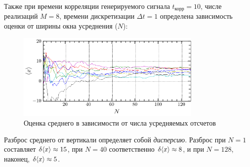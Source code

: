 \documentclass[a4paper,14pt]{extarticle}
\begin{document}
Также при времени корреляции генерируемого сигнала $t_\text{корр}=10$, числе реализаций $M=8$, времени дискретизации $\Delta t=1$ определена зависимость оценки от ширины окна усреднения ($N$):
\begin{figure}[H]
    \centering
    \includegraphics[width=0.8\textwidth]{fig/mean_from_N}
    \caption{Оценка среднего в зависимости от числа усредняемых отсчетов}
    \label{fig:mean_from_n}
\end{figure}

Разброс среднего от вертикали определяет собой \textit{дисперсию}. Разброс при $N=1$ составляет $\delta \langle x\rangle\approx15$, при $N=40$ соответственно $\delta \langle x\rangle\approx8$, и при $N=128$, наконец, $\delta \langle x\rangle\approx5$.
\end{document}
